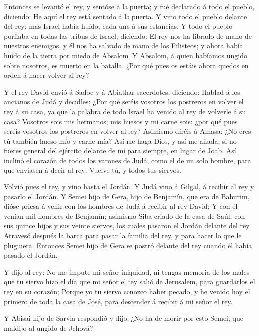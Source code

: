  Entonces se levantó el rey, y sentóse á la puerta; y fué
declarado á todo el pueblo, diciendo: He aquí el rey está sentado á la
puerta. Y vino todo el pueblo delante del rey; mas Israel había huído,
cada uno á sus estancias.  Y todo el pueblo porfiaba en
todas las tribus de Israel, diciendo: El rey nos ha librado de mano de
nuestros enemigos, y él nos ha salvado de mano de los Filisteos; y ahora
había huído de la tierra por miedo de Absalom.  Y Absalom,
á quien habíamos ungido sobre nosotros, es muerto en la batalla. ¿Por
qué pues os estáis ahora quedos en orden á hacer volver al rey?

 Y el rey David envió á Sadoc y á Abiathar sacerdotes,
diciendo: Hablad á los ancianos de Judá y decidles: ¿Por qué seréis
vosotros los postreros en volver el rey á su casa, ya que la palabra de
todo Israel ha venido al rey de volverle á su casa? 
Vosotros sois mis hermanos; mis huesos y mi carne sois: ¿por qué pues
seréis vosotros los postreros en volver al rey?  Asimismo
diréis á Amasa: ¿No eres tú también hueso mío y carne mía? Así me haga
Dios, y así me añada, si no fueres general del ejército delante de mí
para siempre, en lugar de Joab.  Así inclinó el corazón de
todos los varones de Judá, como el de un solo hombre, para que enviasen
á decir al rey: Vuelve tú, y todos tus siervos.

 Volvió pues el rey, y vino hasta el Jordán. Y Judá vino á
Gilgal, á recibir al rey y pasarlo el Jordán.  Y Semei hijo
de Gera, hijo de Benjamín, que era de Bahurim, dióse priesa á venir con
los hombres de Judá á recibir al rey David;  Y con él
venían mil hombres de Benjamín; asimismo Siba criado de la casa de Saúl,
con sus quince hijos y sus veinte siervos, los cuales pasaron el Jordán
delante del rey.  Atravesó después la barca para pasar la
familia del rey, y para hacer lo que le pluguiera. Entonces Semei hijo
de Gera se postró delante del rey cuando él había pasado el Jordán.

 Y dijo al rey: No me impute mi señor iniquidad, ni tengas
memoria de los males que tu siervo hizo el día que mi señor el rey salió
de Jerusalem, para guardarlos el rey en su corazón;  Porque
yo tu siervo conozco haber pecado, y he venido hoy el primero de toda la
casa de José, para descender á recibir á mi señor el rey.

 Y Abisai hijo de Sarvia respondió y dijo: ¿No ha de morir
por esto Semei, que maldijo al ungido de Jehová?


